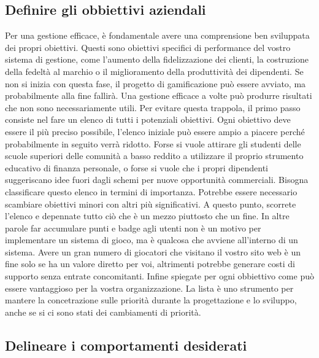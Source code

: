\begin{itemize}
\subsection{Definire gli obbiettivi aziendali}

Per una gestione efficace, è fondamentale avere una comprensione ben sviluppata dei propri obiettivi.
Questi sono obiettivi specifici di performance del vostro sistema di gestione, come l'aumento della fidelizzazione dei clienti, la costruzione della fedeltà al marchio o il miglioramento della produttività dei dipendenti. Se non si inizia con questa fase, il progetto di gamificazione può essere avviato, ma probabilmente alla fine fallirà. Una gestione efficace a volte può produrre risultati che non sono necessariamente utili. Per evitare questa trappola, il primo passo consiste nel fare un elenco di tutti i potenziali obiettivi. Ogni obiettivo deve essere il più preciso possibile, l'elenco iniziale può essere ampio a piacere perché probabilmente in seguito verrà ridotto. Forse si vuole attirare gli studenti delle scuole superiori delle comunità a basso reddito a utilizzare il proprio strumento educativo di finanza personale, o forse si vuole che i propri dipendenti suggeriscano idee fuori dagli schemi per nuove opportunità commerciali. Bisogna classificare questo elenco in termini di importanza. Potrebbe essere necessario scambiare obiettivi minori con altri più significativi. A questo punto, scorrete l'elenco e depennate tutto ciò che è un mezzo piuttosto che un fine. In altre parole far accumulare punti e badge agli utenti non è un motivo per implementare un sistema di gioco, ma è qualcosa che avviene all'interno di un sistema. Avere un gran numero di giocatori che visitano il vostro sito web è un fine solo se ha un valore diretto per voi, altrimenti potrebbe generare costi di supporto senza entrate concomitanti. Infine spiegate per ogni obbiettivo come può essere vantaggioso per la vostra organizzazione. La lista è uno strumento per mantere la concetrazione sulle priorità durante la progettazione e lo sviluppo, anche se si ci sono stati dei cambiamenti di priorità.

\subsection{Delineare i comportamenti desiderati}


\end{itemize}
